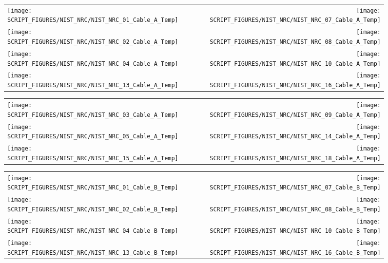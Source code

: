 \begin{figure}[!ht]
\begin{tabular*}{\textwidth}{l@{\extracolsep{\fill}}r}
\texttt{[image: SCRIPT\_FIGURES/NIST\_NRC/NIST\_NRC\_01\_Cable\_A\_Temp]} &
\texttt{[image: SCRIPT\_FIGURES/NIST\_NRC/NIST\_NRC\_07\_Cable\_A\_Temp]} \\
\texttt{[image: SCRIPT\_FIGURES/NIST\_NRC/NIST\_NRC\_02\_Cable\_A\_Temp]} &
\texttt{[image: SCRIPT\_FIGURES/NIST\_NRC/NIST\_NRC\_08\_Cable\_A\_Temp]} \\
\texttt{[image: SCRIPT\_FIGURES/NIST\_NRC/NIST\_NRC\_04\_Cable\_A\_Temp]} &
\texttt{[image: SCRIPT\_FIGURES/NIST\_NRC/NIST\_NRC\_10\_Cable\_A\_Temp]} \\
\texttt{[image: SCRIPT\_FIGURES/NIST\_NRC/NIST\_NRC\_13\_Cable\_A\_Temp]} &
\texttt{[image: SCRIPT\_FIGURES/NIST\_NRC/NIST\_NRC\_16\_Cable\_A\_Temp]}
\end{tabular*}
\label{NIST_NRC_Cable_A_Closed}
\end{figure}

\begin{figure}[!ht]
\begin{tabular*}{\textwidth}{l@{\extracolsep{\fill}}r}
\texttt{[image: SCRIPT\_FIGURES/NIST\_NRC/NIST\_NRC\_03\_Cable\_A\_Temp]} &
\texttt{[image: SCRIPT\_FIGURES/NIST\_NRC/NIST\_NRC\_09\_Cable\_A\_Temp]} \\
\texttt{[image: SCRIPT\_FIGURES/NIST\_NRC/NIST\_NRC\_05\_Cable\_A\_Temp]} &
\texttt{[image: SCRIPT\_FIGURES/NIST\_NRC/NIST\_NRC\_14\_Cable\_A\_Temp]} \\
\texttt{[image: SCRIPT\_FIGURES/NIST\_NRC/NIST\_NRC\_15\_Cable\_A\_Temp]} &
\texttt{[image: SCRIPT\_FIGURES/NIST\_NRC/NIST\_NRC\_18\_Cable\_A\_Temp]}
\end{tabular*}
\label{NIST_NRC_Cable_A_Open}
\end{figure}

\begin{figure}[!ht]
\begin{tabular*}{\textwidth}{l@{\extracolsep{\fill}}r}
\texttt{[image: SCRIPT\_FIGURES/NIST\_NRC/NIST\_NRC\_01\_Cable\_B\_Temp]} &
\texttt{[image: SCRIPT\_FIGURES/NIST\_NRC/NIST\_NRC\_07\_Cable\_B\_Temp]} \\
\texttt{[image: SCRIPT\_FIGURES/NIST\_NRC/NIST\_NRC\_02\_Cable\_B\_Temp]} &
\texttt{[image: SCRIPT\_FIGURES/NIST\_NRC/NIST\_NRC\_08\_Cable\_B\_Temp]} \\
\texttt{[image: SCRIPT\_FIGURES/NIST\_NRC/NIST\_NRC\_04\_Cable\_B\_Temp]} &
\texttt{[image: SCRIPT\_FIGURES/NIST\_NRC/NIST\_NRC\_10\_Cable\_B\_Temp]} \\
\texttt{[image: SCRIPT\_FIGURES/NIST\_NRC/NIST\_NRC\_13\_Cable\_B\_Temp]} &
\texttt{[image: SCRIPT\_FIGURES/NIST\_NRC/NIST\_NRC\_16\_Cable\_B\_Temp]}
\end{tabular*}
\label{NIST_NRC_Cable_B_Closed}
\end{figure}

